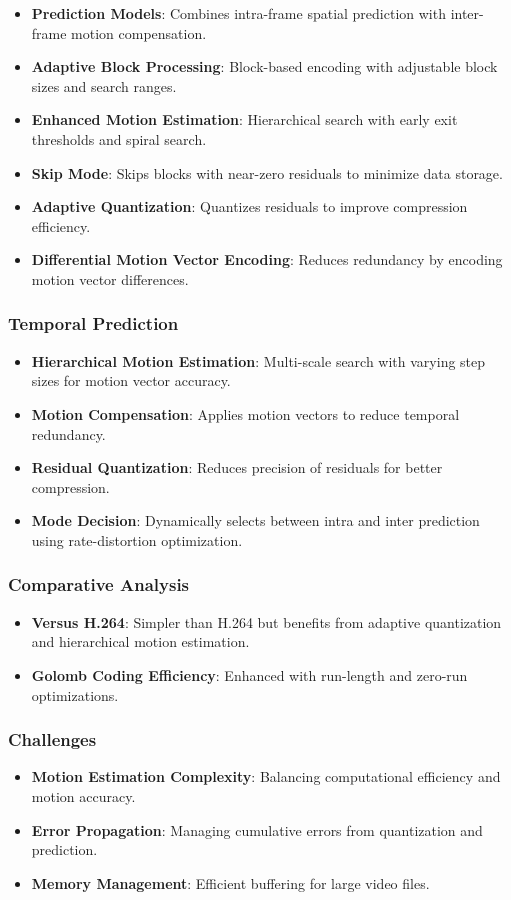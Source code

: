 \documentclass[a4paper,14pt]{article}
\begin{document}
\begin{itemize}
\item \textbf{Prediction Models}: Combines intra-frame spatial prediction with inter-frame motion compensation.
\item \textbf{Adaptive Block Processing}: Block-based encoding with adjustable block sizes and search ranges.
\item \textbf{Enhanced Motion Estimation}: Hierarchical search with early exit thresholds and spiral search.
\item \textbf{Skip Mode}: Skips blocks with near-zero residuals to minimize data storage.
\item \textbf{Adaptive Quantization}: Quantizes residuals to improve compression efficiency.
\item \textbf{Differential Motion Vector Encoding}: Reduces redundancy by encoding motion vector differences.
\end{itemize}

\subsubsection{Temporal Prediction}
\begin{itemize}
\item \textbf{Hierarchical Motion Estimation}: Multi-scale search with varying step sizes for motion vector accuracy.
\item \textbf{Motion Compensation}: Applies motion vectors to reduce temporal redundancy.
\item \textbf{Residual Quantization}: Reduces precision of residuals for better compression.
\item \textbf{Mode Decision}: Dynamically selects between intra and inter prediction using rate-distortion optimization.
\end{itemize}

\subsubsection{Comparative Analysis}
\begin{itemize}
\item \textbf{Versus H.264}: Simpler than H.264 but benefits from adaptive quantization and hierarchical motion estimation.
\item \textbf{Golomb Coding Efficiency}: Enhanced with run-length and zero-run optimizations.
\end{itemize}

\subsubsection{Challenges}
\begin{itemize}
\item \textbf{Motion Estimation Complexity}: Balancing computational efficiency and motion accuracy.
\item \textbf{Error Propagation}: Managing cumulative errors from quantization and prediction.
\item \textbf{Memory Management}: Efficient buffering for large video files.
\end{itemize}
\end{document}
